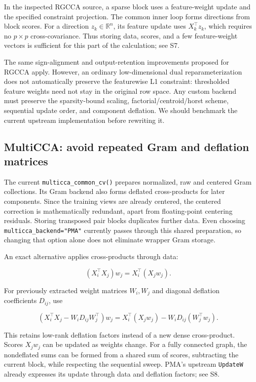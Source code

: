 \documentclass[
  11pt,
]{article}
\begin{document}
In the inspected RGCCA source, a sparse block uses a feature-weight
update and the specified constraint projection. The common inner loop
forms directions from block scores. For a direction
\(z_k\in\mathbb R^n\), its feature update uses \(X_k^\top z_k\), which
requires no \(p\times p\) cross-covariance. Thus storing data, scores,
and a few feature-weight vectors is sufficient for this part of the
calculation; see S7.

The same sign-alignment and output-retention improvements proposed for
RGCCA apply. However, an ordinary low-dimensional dual
reparameterization does not automatically preserve the featurewise L1
constraint: thresholded feature weights need not stay in the original
row space. Any custom backend must preserve the sparsity-bound scaling,
factorial/centroid/horst scheme, sequential update order, and component
deflation. We should benchmark the current upstream implementation
before rewriting it.

\hypertarget{multicca-avoid-repeated-gram-and-deflation-matrices}{%
\subsection{MultiCCA: avoid repeated Gram and deflation
matrices}\label{multicca-avoid-repeated-gram-and-deflation-matrices}}

The current \texttt{multicca\_common\_cv()} prepares normalized, raw and
centered Gram collections. Its Gram backend also forms deflated
cross-products for later components. Since the training views are
already centered, the centered correction is mathematically redundant,
apart from floating-point centering residuals. Storing transposed pair
blocks duplicates further data. Even choosing
\texttt{multicca\_backend="PMA"} currently passes through this shared
preparation, so changing that option alone does not eliminate wrapper
Gram storage.

An exact alternative applies cross-products through data:

\[
(X_i^\top X_j)w_j=X_i^\top(X_jw_j).
\]

For previously extracted weight matrices \(W_i,W_j\) and diagonal
deflation coefficients \(D_{ij}\), use

\[
\left(X_i^\top X_j-W_iD_{ij}W_j^\top\right)w_j
=X_i^\top(X_jw_j)-W_iD_{ij}(W_j^\top w_j).
\tag{14}
\]

This retains low-rank deflation factors instead of a new dense
cross-product. Scores \(X_jw_j\) can be updated as weights change. For a
fully connected graph, the nondeflated sums can be formed from a shared
sum of scores, subtracting the current block, while respecting the
sequential sweep. PMA's upstream \texttt{UpdateW} already expresses its
update through data and deflation factors; see S8.
\end{document}
